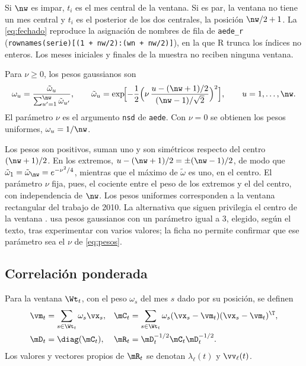 Si $\nw$ es impar, $t_i$ es el mes central de la ventana. Si es par, la ventana no tiene un mes
central y $t_i$ es el posterior de los dos centrales, la posición $\nw/2+1$. La
\cref{eq:fechado} reproduce la asignación de nombres de fila de \texttt{aede\_r}
(\texttt{rownames(serie)[(1 + nw/2):(wn + nw/2)]}), en la que R trunca los índices no enteros.
Los meses iniciales y finales de la muestra no reciben ninguna ventana.

\begin{definicion}\label{def:pesos}
Para $\nu\ge0$, los pesos gaussianos son
\begin{equation}\label{eq:pesos}
  \omega_u=\frac{\tilde\omega_u}{\sum_{u'=1}^{\nw}\tilde\omega_{u'}},\qquad
  \tilde\omega_u=\exp\!\Bigl[-\frac12\Bigl(\nu\,\frac{u-(\nw+1)/2}{(\nw-1)/\sqrt2}\Bigr)^{2}\Bigr],
  \qquad u=1,\dots,\nw .
\end{equation}
El parámetro $\nu$ es el argumento \texttt{nsd} de \texttt{aede}. Con $\nu=0$ se obtienen los
pesos uniformes, $\omega_u=1/\nw$.
\end{definicion}

Los pesos son positivos, suman uno y son simétricos respecto del centro $(\nw+1)/2$. En los
extremos, $u-(\nw+1)/2=\pm(\nw-1)/2$, de modo que $\tilde\omega_1=\tilde\omega_{\nw}=e^{-\nu^2/4}$,
mientras que el máximo de $\tilde\omega$ es uno, en el centro. El parámetro $\nu$ fija, pues, el
cociente entre el peso de los extremos y el del centro, con independencia de $\nw$. Los pesos
uniformes corresponden a la ventana rectangular del trabajo de 2010. La alternativa que siguen
\textcite{camiz_cerda_atoche_2026} privilegia el centro de la ventana . \textcite{atoche_murrieta_2022}
usa pesos gaussianos con un parámetro igual a 3, elegido, según el texto, tras experimentar con
varios valores; la ficha no permite confirmar que ese parámetro sea el $\nu$ de \cref{eq:pesos}.

\subsection{Correlación ponderada}

\begin{definicion}\label{def:epca}
Para la ventana $\Wt_t$, con el peso $\omega_s$ del mes $s$ dado por su posición, se definen
\begin{equation}\label{eq:epca}
\begin{aligned}
  \vm_t&=\sum_{s\in\Wt_t}\omega_s\vx_s, &
  \mC_t&=\sum_{s\in\Wt_t}\omega_s(\vx_s-\vm_t)(\vx_s-\vm_t)^{\T},\\
  \mD_t&=\diag(\mC_t), &
  \mR_t&=\mD_t^{-1/2}\mC_t\mD_t^{-1/2}.
\end{aligned}
\end{equation}
Los valores y vectores propios de $\mR_t$ se denotan $\lambda_\ell(t)$ y $\vv_\ell(t)$.
\end{definicion}

